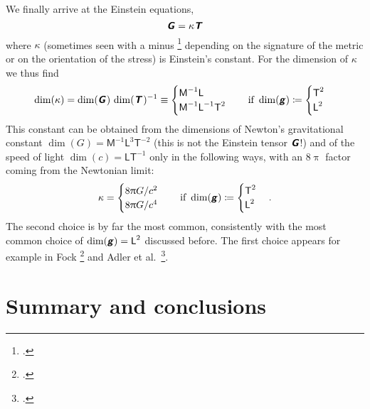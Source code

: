 \documentclass[a4paper,12pt,onecolumn,oneside,article,british]{memoir}
\makeatletter
\newcommand*{\mathte}[1]{\textbf{\textit{\textsf{#1}}}}
\newcommand*{\citep}{\footcites}
\newcommand*{\pu}{\uppi}%
\newcommand*{\defd}{\coloneqq}
\newcommand*{\sect}{\S}%
\newcommand*{\eqn}{eq.}%
\newcommand*{\eqns}{eqs}%
\newcommand*{\eg}{{e.g.}}
\newcommand*{\etal}{{et al.}}
\newcommand*{\q}{}%
\DeclareRobustCommand*{\q}{%
  \mathbin{\mathpalette\bigcdot@{}}%
}
\newcommand*{\bigcdot@scalefactor}{0.7}
\newcommand*{\bigcdot@widthfactor}{1.5}
\newcommand*{\bigcdot@}[2]{%
  \sbox0{$#1\vcenter{}$}%
  \sbox2{$#1\cdot\m@th$}%
  \hbox to \bigcdot@widthfactor\wd2{%
    \hfil
    \raise\ht0\hbox{%
      \scalebox{\bigcdot@scalefactor}{%
        \lower\ht0\hbox{$#1\bullet\m@th$}%
      }%
    }%
    \hfil
  }%
}
\newcommand*{\Le}{\textsf{L}}
\newcommand*{\Ti}{\textsf{T}}
\newcommand*{\Ma}{\textsf{M}}
\newcommand*{\yg}{\mathte{g}}
\newcommand*{\yT}{\mathte{T}}
\newcommand*{\yG}{\mathte{G}}
\renewcommand*{\i}{\indices}
\newcommand*{\yk}{\kappa}
\makeatother
\begin{document}
We finally arrive at the Einstein equations,
\begin{equation}
  \label{eq:einstein}
  \yG%
  = \yk \yT%
\end{equation}
where $\yk$ (sometimes seen with a minus \citep[\eg][\sect~78
\eqn~(78.3)]{tolman1934_t1949}[\sect~52
\eqn~(52.06)]{fock1955_t1964}[\sect~14.2 \eqn~(14.8)]{rindler2001_r2006}
depending on the signature of the metric or on the orientation of the
stress) is Einstein's constant. For the dimension of $\yk$ we thus find
\begin{equation}
  \label{eq:dim_k_1}
  \dim(\yk) = \dim(\yG\i{_{\q}^{\q}}) \, \dim(\yT\i{_{\q}^{\q}})^{-1} \equiv
    \begin{cases}
    \Ma^{-1}\Le \\
    \Ma^{-1}\Le^{-1}\Ti^{2}
  \end{cases}
  \quad\text{if }\dim(\yg)\defd
  \begin{cases}
     \Ti^2 \\
    \Le^2
  \end{cases}
\end{equation}
This constant can be obtained from the dimensions of Newton's gravitational
constant $\dim(G)=\Ma^{-1}\Le^{3}\Ti^{-2}$ (this is not the Einstein tensor
$\yG$!) and of the speed of light $\dim(c)=\Le\Ti^{-1}$ only in the
following ways, with an $8\pu$ factor coming from the Newtonian limit:
\begin{equation}
  \label{eq:k_Gc}
  \yk =     \begin{cases}
   8\pu G/c^{2} \\
   8\pu G/c^{4}
  \end{cases}
  \quad\text{if }\dim(\yg)\defd
  \begin{cases}
     \Ti^2 \\
    \Le^2
  \end{cases}.
\end{equation}
The second choice is by far the most common, consistently with the most
common choice of $\dim(\yg)=\Le^{2}$ discussed before. The first choice
appears for example in Fock \citep[\sect~55 \eqns~(55.15)
and~(52.06)]{fock1955_t1964} and Adler \etal\ \citep[\sect~10.5
\eqn~(10.98)]{adleretal1965_r1975}.


\section{Summary and conclusions}
\label{sec:summary}
\end{document}
